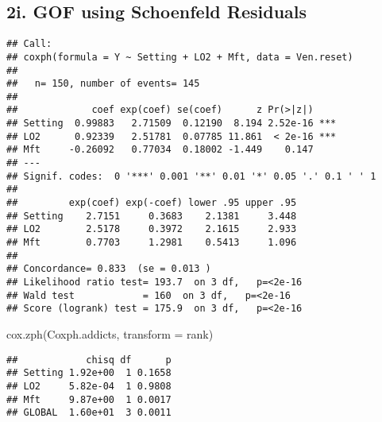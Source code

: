 \documentclass[
]{article}
\newenvironment{Shaded}{\begin{snugshade}}{\end{snugshade}}
\newcommand{\AttributeTok}[1]{\textcolor[rgb]{0.77,0.63,0.00}{#1}}
\newcommand{\FunctionTok}[1]{\textcolor[rgb]{0.00,0.00,0.00}{#1}}
\newcommand{\NormalTok}[1]{#1}
\newcommand{\OtherTok}[1]{\textcolor[rgb]{0.56,0.35,0.01}{#1}}
\newcommand{\SpecialCharTok}[1]{\textcolor[rgb]{0.00,0.00,0.00}{#1}}
\begin{document}
\hypertarget{i.-gof-using-schoenfeld-residuals}{%
\subsection{2i. GOF using Schoenfeld
Residuals}\label{i.-gof-using-schoenfeld-residuals}}

\begin{Shaded}
\end{Shaded}

\begin{verbatim}
## Call:
## coxph(formula = Y ~ Setting + LO2 + Mft, data = Ven.reset)
## 
##   n= 150, number of events= 145 
## 
##             coef exp(coef) se(coef)      z Pr(>|z|)    
## Setting  0.99883   2.71509  0.12190  8.194 2.52e-16 ***
## LO2      0.92339   2.51781  0.07785 11.861  < 2e-16 ***
## Mft     -0.26092   0.77034  0.18002 -1.449    0.147    
## ---
## Signif. codes:  0 '***' 0.001 '**' 0.01 '*' 0.05 '.' 0.1 ' ' 1
## 
##         exp(coef) exp(-coef) lower .95 upper .95
## Setting    2.7151     0.3683    2.1381     3.448
## LO2        2.5178     0.3972    2.1615     2.933
## Mft        0.7703     1.2981    0.5413     1.096
## 
## Concordance= 0.833  (se = 0.013 )
## Likelihood ratio test= 193.7  on 3 df,   p=<2e-16
## Wald test            = 160  on 3 df,   p=<2e-16
## Score (logrank) test = 175.9  on 3 df,   p=<2e-16
\end{verbatim}

\begin{Shaded}
\begin{Highlighting}[]
\FunctionTok{cox.zph}\NormalTok{(Coxph.addicts, }\AttributeTok{transform =}\NormalTok{ rank)}
\end{Highlighting}
\end{Shaded}

\begin{verbatim}
##            chisq df      p
## Setting 1.92e+00  1 0.1658
## LO2     5.82e-04  1 0.9808
## Mft     9.87e+00  1 0.0017
## GLOBAL  1.60e+01  3 0.0011
\end{verbatim}
\end{document}
